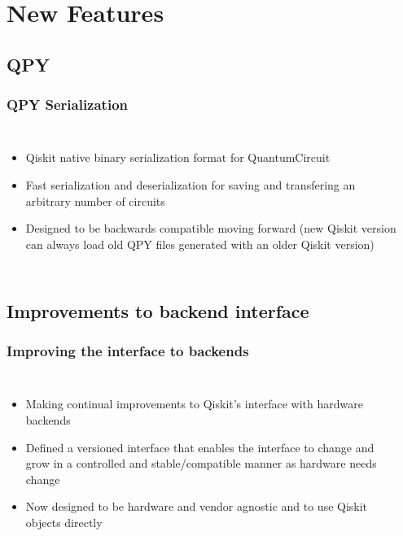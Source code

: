 \documentclass[aspectratio=169,11pt,hyperref={colorlinks=true}]{beamer}
\begin{document}
\section{New Features}
\subsection{QPY}
\begin{frame}
    \frametitle{QPY Serialization}
    \begin{columns}
            \begin{itemize}
                \item Qiskit native binary serialization format for QuantumCircuit
                \item Fast serialization and deserialization for saving and
                    transfering an arbitrary number of circuits
                \item Designed to be backwards compatible moving forward (new Qiskit version can always load old QPY files generated with an older Qiskit version)
            \end{itemize}
            \inputminted[fontsize=\tiny]{python}{qpy_demo.py}
    \end{columns}
\end{frame}

\subsection{Improvements to backend interface}
\begin{frame}
    \frametitle{Improving the interface to backends}
    \begin{columns}
            \begin{itemize}
                \item Making continual improvements to Qiskit's interface with
                    hardware backends
                \item Defined a versioned interface that enables the interface
                    to change and grow in a controlled and stable/compatible
                    manner as hardware needs change
                \item Now designed to be hardware and vendor agnostic and to
                    use Qiskit objects directly
            \end{itemize}
            \inputminted[fontsize=\tiny]{python}{backend_demo.py} 
    \end{columns}
\end{frame}
\end{document}
